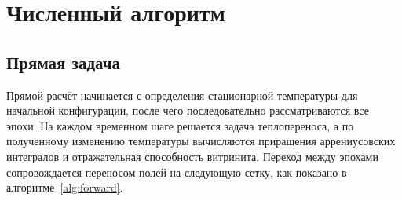 \section{Численный алгоритм}
\label{sec:algorithm}

\subsection{Прямая задача}
\label{sec:forward-method}

Прямой расчёт начинается с определения стационарной температуры для начальной конфигурации, после чего последовательно рассматриваются все эпохи. На каждом временном шаге решается задача теплопереноса, а по полученному изменению температуры вычисляются приращения аррениусовских интегралов и отражательная способность витринита. Переход между эпохами сопровождается переносом полей на следующую сетку, как показано в алгоритме~\ref{alg:forward}.

